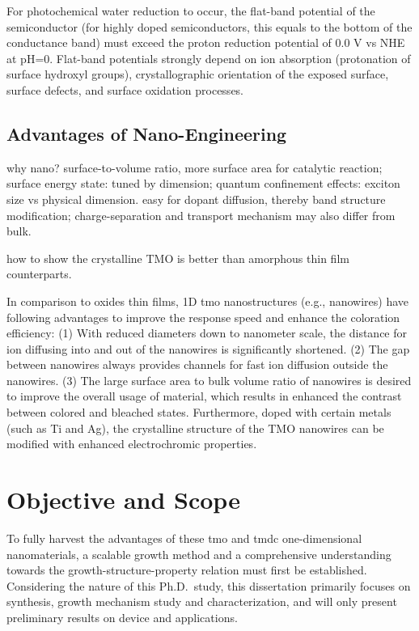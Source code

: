 For photochemical water reduction to occur, the flat-band potential of the semiconductor (for highly doped semiconductors, this equals to the bottom of the conductance band) must exceed the proton reduction potential of 0.0 V vs NHE at pH=0.\cite{Osterloh2008} Flat-band potentials strongly depend on ion absorption (protonation of surface hydroxyl groups), crystallographic orientation of the exposed surface, surface defects, and surface oxidation processes. 

\subsection{Advantages of Nano-Engineering}

why nano? surface-to-volume ratio, more surface area for catalytic reaction; surface energy state: tuned by dimension; quantum confinement effects: exciton size vs physical dimension. easy for dopant diffusion, thereby band structure modification; charge-separation and transport mechanism may also differ from bulk.

how to show the crystalline TMO is better than amorphous thin film counterparts.

In comparison to oxides thin films, 1D \gls{tmo} nanostructures (e.g., nanowires) have following advantages to improve the response speed and enhance the coloration efficiency: (1) With reduced diameters down to nanometer scale, the distance for ion diffusing into and out of the nanowires is significantly shortened. (2) The gap between nanowires always provides channels for fast ion diffusion outside the nanowires. (3) The large surface area to bulk volume ratio of nanowires is desired to improve the overall usage of material, which results in enhanced the contrast between colored and bleached states. Furthermore, doped with certain metals (such as Ti and Ag), the crystalline structure of the TMO nanowires can be modified with enhanced electrochromic properties.\cite{Xiong2008} 

\section{Objective and Scope}
To fully harvest the advantages of these \gls{tmo} and \gls{tmdc} one-dimensional nanomaterials, a scalable growth method and a comprehensive understanding towards the growth-structure-property relation must first be established. Considering the nature of this Ph.D.\ study, this dissertation primarily focuses on synthesis, growth mechanism study and characterization, and will only present preliminary results on device and applications.

